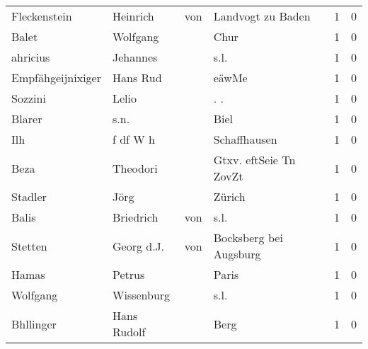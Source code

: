 \begin{tabular}{llllrr}
             Fleckenstein &                           Heinrich &         von &                           Landvogt zu Baden &          1 &         0 \\
                    Balet &                           Wolfgang &             &                                        Chur &          1 &         0 \\
                 ahricius &                           Jehannes &             &                                        s.l. &          1 &         0 \\
        Empfähgeijnixiger &                           Hans Rud &             &                                       eäwMe &          1 &         0 \\
                  Sozzini &                              Lelio &             &                                        . .  &          1 &         0 \\
                   Blarer &                               s.n. &             &                                        Biel &          1 &         0 \\
                      Ilh &                           f df W h &             &                                Schaffhausen &          1 &         0 \\
                     Beza &                           Theodori &             &                      Gtxv. eftSeie Tn ZovZt &          1 &         0 \\
                  Stadler &                               Jörg &             &                                      Zürich &          1 &         0 \\
                    Balis &                          Briedrich &         von &                                        s.l. &          1 &         0 \\
                  Stetten &                         Georg d.J. &         von &                      Bocksberg bei Augsburg &          1 &         0 \\
                    Hamas &                             Petrus &             &                                       Paris &          1 &         0 \\
                 Wolfgang &                         Wissenburg &             &                                        s.l. &          1 &         0 \\
                Bhllinger &                        Hans Rudolf &             &                                        Berg &          1 &         0 \\

\end{tabular}
